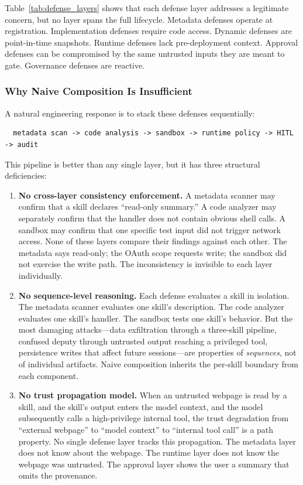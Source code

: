 Table~\ref{tab:defense_layers} shows that each defense layer addresses a legitimate concern, but no layer spans the full lifecycle. Metadata defenses operate at registration. Implementation defenses require code access. Dynamic defenses are point-in-time snapshots. Runtime defenses lack pre-deployment context. Approval defenses can be compromised by the same untrusted inputs they are meant to gate. Governance defenses are reactive.

\subsubsection{Why Naive Composition Is Insufficient}

A natural engineering response is to stack these defenses sequentially:

\begin{verbatim}
  metadata scan -> code analysis -> sandbox -> runtime policy -> HITL -> audit
\end{verbatim}

This pipeline is better than any single layer, but it has three structural deficiencies:

\begin{enumerate}
    \item \textbf{No cross-layer consistency enforcement.} A metadata scanner may confirm that a skill declares ``read-only summary.'' A code analyzer may separately confirm that the handler does not contain obvious shell calls. A sandbox may confirm that one specific test input did not trigger network access. None of these layers compare their findings against each other. The metadata says read-only; the OAuth scope requests write; the sandbox did not exercise the write path. The inconsistency is invisible to each layer individually.

    \item \textbf{No sequence-level reasoning.} Each defense evaluates a skill in isolation. The metadata scanner evaluates one skill's description. The code analyzer evaluates one skill's handler. The sandbox tests one skill's behavior. But the most damaging attacks---data exfiltration through a three-skill pipeline, confused deputy through untrusted output reaching a privileged tool, persistence writes that affect future sessions---are properties of \emph{sequences}, not of individual artifacts. Naive composition inherits the per-skill boundary from each component.

    \item \textbf{No trust propagation model.} When an untrusted webpage is read by a skill, and the skill's output enters the model context, and the model subsequently calls a high-privilege internal tool, the trust degradation from ``external webpage'' to ``model context'' to ``internal tool call'' is a path property. No single defense layer tracks this propagation. The metadata layer does not know about the webpage. The runtime layer does not know the webpage was untrusted. The approval layer shows the user a summary that omits the provenance.
\end{enumerate}

